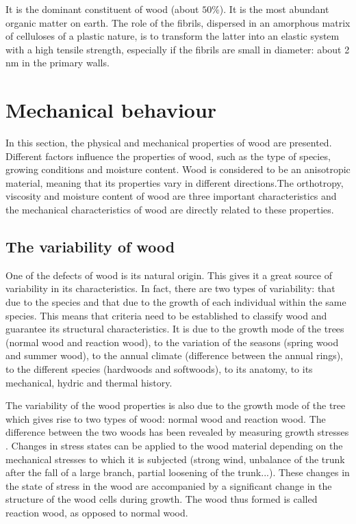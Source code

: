 It is the dominant constituent of wood (about $50 \%$). It is the most abundant organic matter on earth. The role of the fibrils, dispersed in an amorphous matrix of celluloses of a plastic nature, is to transform the latter into an elastic system with a high tensile strength, especially if the fibrils are small in diameter: about 2 nm in the primary walls.

\section{Mechanical behaviour}

In this section, the physical and mechanical properties of wood are presented. Different factors influence the properties of wood, such as the type of species, growing conditions and moisture content. Wood is considered to be an anisotropic material, meaning that its properties vary in different directions.The orthotropy, viscosity and moisture content of wood are three important characteristics and the mechanical characteristics of wood are directly related to these properties.

\subsection{The variability of wood}

One of the defects of wood is its natural origin. This gives it a great source of variability in its characteristics. In fact, there are two types of variability: that due to the species and that due to the growth of each individual within the same species. This means that criteria need to be established to classify wood and guarantee its structural characteristics. It is due to the growth mode of the trees (normal wood and reaction wood), to the variation of the seasons (spring wood and summer wood), to the annual climate (difference between the annual rings), to the different species (hardwoods and softwoods), to its anatomy, to its mechanical, hydric and thermal history.

The variability of the wood properties is also due to the growth mode of the tree which gives rise to two types of wood: normal wood and reaction wood. The difference between the two woods has been revealed by measuring growth stresses \citep{BrunoClair2003-2004}. Changes in stress states can be applied to the wood material depending on the mechanical stresses to which it is subjected (strong wind, unbalance of the trunk after the fall of a large branch, partial loosening of the trunk...). These changes in the state of stress in the wood are accompanied by a significant change in the structure of the wood cells during growth. The wood thus formed is called reaction wood, as opposed to normal wood.

